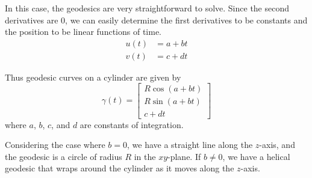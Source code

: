\documentclass[12pt]{article}
\begin{document}
In this case, the geodesics are very straightforward to solve.
Since the second derivatives are 0, we can easily determine the first derivatives to be constants and the position to be linear functions of time.
\begin{align*}
	u(t) &= a + b t \\
	v(t) &= c + d t
\end{align*}

Thus geodesic curves on a cylinder are given by 
\[
	\gamma(t) = \begin{bmatrix} R \cos (a + b t) \\ R \sin (a + b t) \\ c + d t \end{bmatrix}
\]
where \(a\), \(b\), \(c\), and \(d\) are constants of integration.

Considering the case where \(b = 0\), we have a straight line along the \(z\)-axis, and the geodesic is a circle of radius \(R\) in the \(xy\)-plane.
If \(b \neq 0\), we have a helical geodesic that wraps around the cylinder as it moves along the \(z\)-axis.
\end{document}
